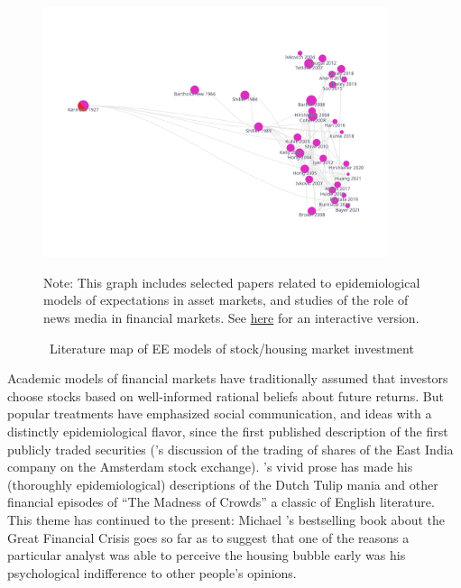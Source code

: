 


\begin{figure}[!ht] \centering  %
	\caption{ ~Literature map of EE models of stock/housing market investment}
	\label{fig:graph_investment}
	\centerline{\includegraphics[width=0.9\textwidth]{./figures/graph_investment}}
	\begin{flushleft}
		{\footnotesize Note: This graph includes selected papers related to epidemiological models of expectations in asset markets, and studies of the role of news media in financial markets. See \href{https://app.litmaps.co/shared/E25276CA-8725-437B-8241-11961EFB3FB4}{here} for an interactive version.}
	\end{flushleft}
\end{figure}

Academic models of financial markets have traditionally assumed that investors choose stocks based on well-informed rational beliefs about future returns.  But popular treatments have emphasized social communication, and ideas with a distinctly epidemiological flavor, since the first published description of  the first publicly traded securities (\cite{vegaConfusion}'s discussion of the trading of shares of the East India company on the Amsterdam stock exchange).  \cite{mackay1850memoirs}'s vivid prose has made his (thoroughly epidemiological) descriptions of the Dutch Tulip mania and other financial episodes of ``The Madness of Crowds'' a classic of English literature.  This theme has continued to the present: Michael \cite{lewis2011big}'s bestselling book about the Great Financial Crisis goes so far as to suggest that one of the reasons a particular analyst was able to perceive the housing bubble early was his psychological indifference to other people's opinions.

